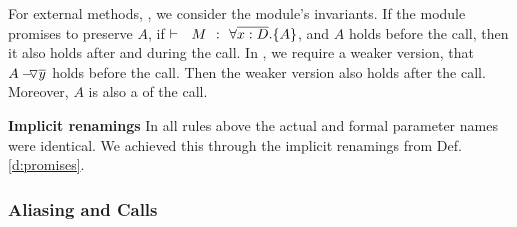 {%
{For external methods,  {}, we consider the module's invariants. If the module promises to preserve $A$, \ie if  $\promises M   {\TwoStatesN {\overline {x:D}} {A}}$, and   $A$  holds before the call, then it also holds after and during the call. }
In  {}, we require a weaker version,  \ie that   $  \PushAS {y}{A}$ holds before the call. Then the 
weaker version also holds after the call. Moreover, $A$ is also a \midcond of the call.
}


\vspace{.1cm}
 {{
\noindent
\textbf{Implicit renamings} In all rules above  the actual and formal parameter names were identical. We achieved this through the implicit renamings from Def. \ref{d:promises}.  
 }}
 
\subsubsection{Aliasing and Calls}


%
%
%





